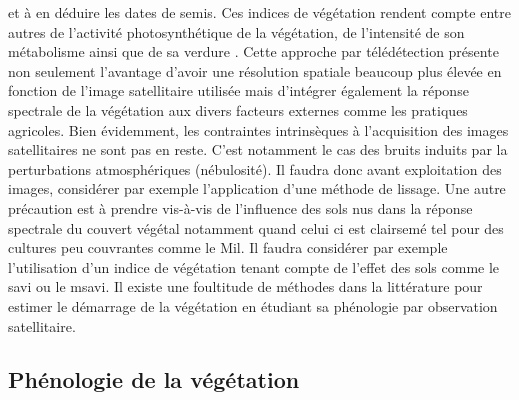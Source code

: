 et à en déduire les dates de semis. Ces indices de végétation rendent compte entre autres de l’activité photosynthétique de la
végétation, de l’intensité de son métabolisme ainsi que de sa verdure \citep{Duarte2018}. Cette approche par télédétection présente non seulement l'avantage d'avoir une résolution 
spatiale beaucoup plus élevée en fonction de l'image 
satellitaire utilisée mais d'intégrer également la réponse spectrale de la végétation aux divers facteurs externes comme les pratiques agricoles. Bien évidemment, les contraintes intrinsèques à
l'acquisition des images satellitaires ne sont pas en reste. C'est notamment le cas des bruits induits par la perturbations atmosphériques (nébulosité). Il faudra donc avant exploitation des images, considérer 
par exemple l'application d'une méthode de lissage. Une autre précaution est à prendre vis-à-vis de l'influence des sols nus dans la réponse spectrale du couvert végétal 
notamment quand celui ci est clairsemé tel pour des cultures peu couvrantes comme le Mil. Il faudra considérer par exemple l'utilisation d'un indice de végétation tenant compte de l'effet des sols comme le \acrshort{savi} ou le 
\acrshort{msavi}. Il existe une foultitude de méthodes dans la littérature pour estimer le démarrage de la végétation en étudiant sa phénologie par observation satellitaire. 
  
  \subsection{Phénologie de la végétation}
  
